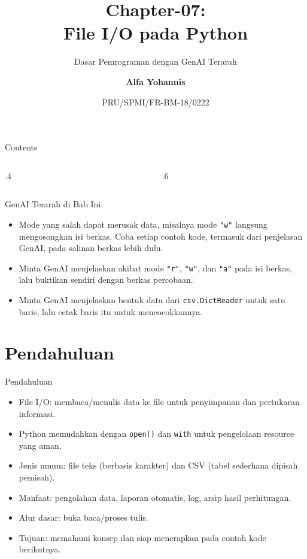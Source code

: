 \documentclass[aspectratio=169, table]{beamer}
\subtitle{Dasar Pemrograman dengan GenAI Terarah}
\title{Chapter-07:\\\LARGE{File I/O pada Python\\}
\vspace{10pt}}
\date[Serial]{\scriptsize {PRU/SPMI/FR-BM-18/0222}}
\author[Pradita]{\small{\textbf{Alfa Yohannis}}}
\begin{document}
\frame{\titlepage}

\begin{frame}[fragile]{Contents}
\vspace{15pt}
\begin{columns}[t]
\begin{column}{.4\textwidth}
\tableofcontents[sections={1-4}]
\end{column}
\begin{column}{.6\textwidth}
\tableofcontents[sections={5-8}]
\end{column}
\end{columns}
\end{frame}


\begin{frame}{GenAI Terarah di Bab Ini}
\small
\begin{itemize}
  \item Mode yang salah dapat merusak data, misalnya mode \texttt{"w"} langsung mengosongkan isi berkas. Coba setiap contoh kode, termasuk dari penjelasan GenAI, pada salinan berkas lebih dulu.
  \item Minta GenAI menjelaskan akibat mode \texttt{"r"}, \texttt{"w"}, dan \texttt{"a"} pada isi berkas, lalu buktikan sendiri dengan berkas percobaan.
  \item Minta GenAI menjelaskan bentuk data dari \texttt{csv.DictReader} untuk satu baris, lalu cetak baris itu untuk mencocokkannya.
\end{itemize}
\end{frame}

\section{Pendahuluan}
\begin{frame}{Pendahuluan}
\vspace{20pt}
\begin{itemize}
  \item File I/O: membaca/menulis data ke file untuk penyimpanan dan pertukaran informasi.
  \item Python memudahkan dengan \texttt{open()} dan \texttt{with} untuk pengelolaan resource yang aman.
  \item Jenis umum: file teks (berbasis karakter) dan CSV (tabel sederhana dipisah pemisah).
  \item Manfaat: pengolahan data, laporan otomatis, log, arsip hasil perhitungan.
  \item Alur dasar: buka \textrightarrow{} baca/proses \textrightarrow{} tulis.
  \item Tujuan: memahami konsep dan siap menerapkan pada contoh kode berikutnya.
\end{itemize}
\end{frame}
\end{document}
